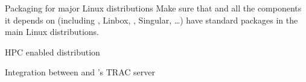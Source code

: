 \begin{workpackage}[id=component-architecture,wphases=3-24!.5,
  title=Component Architecture,lead=UV,
  PSRM=24,UVRM=1,SARM=1, USHRM=4]
\begin{wpdelivs}
    \begin{wpdeliv}[due=48,id=sage-distribution,dissem=PU,nature=O]
      {Packaging for major Linux distributions} Make sure that \Sage and
      all the components it depends on (including \GAP,
      Linbox, \PariGP, Singular, \dots) have standard packages in the
      main Linux distributions.
    \end{wpdeliv}


    \begin{wpdeliv}[due=48,id=hpc-configure,dissem=PU,nature=O]
      {HPC enabled \Sage distribution}
    \end{wpdeliv}

    \begin{wpdeliv}[due=24,id=smc-trac,dissem=PU,nature=O]
      {Integration between \SMC and \Sage's TRAC server}
    \end{wpdeliv}
  \end{wpdelivs}









\end{workpackage}
